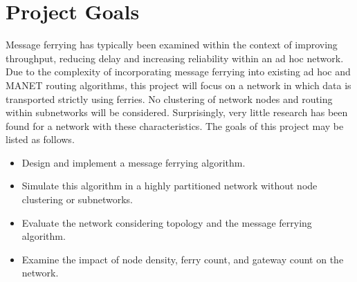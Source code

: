 \section{Project Goals}

Message ferrying has typically been examined within the context of improving throughput, reducing delay and increasing reliability within an ad hoc network.
Due to the complexity of incorporating message ferrying into existing ad hoc and MANET routing algorithms, this project will focus on a network in which data is transported strictly using ferries.
No clustering of network nodes and routing within subnetworks will be considered.
Surprisingly, very little research has been found for a network with these characteristics.
The goals of this project may be listed as follows.

\begin{itemize}
\item Design and implement a message ferrying algorithm.
\item Simulate this algorithm in a highly partitioned network without node clustering or subnetworks.
\item Evaluate the network considering topology and the message ferrying algorithm.
\item Examine the impact of node density, ferry count, and gateway count on the network.
\end{itemize}


%
%

